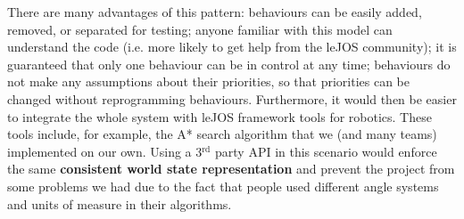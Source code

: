 There are many advantages of this pattern: behaviours can be easily added, removed, or separated for testing; anyone familiar with this model can understand the code (i.e. more likely to get help from the leJOS community); it is guaranteed that only one behaviour can be in control at any time; behaviours do not make any assumptions about their priorities, so that priorities can be changed without reprogramming behaviours. Furthermore, it would then be easier to integrate the whole system with leJOS framework tools for robotics. These tools include, for example, the A* search algorithm that we (and many teams) implemented on our own. Using a 3$^{\textrm{rd}}$ party API in this scenario would enforce the same \textbf{consistent world state representation} and prevent the project from some problems we had due to the fact that people used different angle systems and units of measure in their algorithms.
